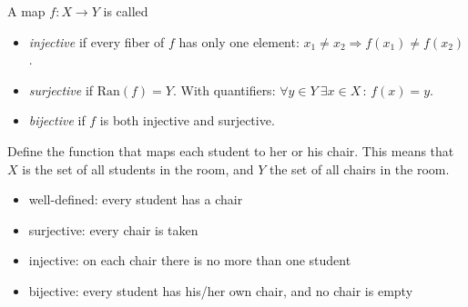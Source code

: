 


\begin{Definition}
A map $f: X \to Y$ is called
\begin{itemize}
 \item \emph{injective} if every fiber of $f$ has only one element: $x_1 \neq x_2 \Rightarrow f(x_1) \neq f(x_2)$.
 \item \emph{surjective} if $\mathrm{Ran}(f)=Y$. With quantifiers: $\forall y\in Y~ \exists x\in X \,:\, f(x)=y$.
 \item \emph{bijective} if $f$ is both injective and surjective.
\end{itemize}
\end{Definition}


\begin{example}
Define the function that maps each student to
her or his chair. This means that $X$ is the set of all students in the room,
and $Y$ the set of all chairs in the room.
\begin{itemize}
 \item well-defined: every student has a chair
 \item surjective: every chair is taken
 \item injective: on each chair there is no more than one student
 \item bijective: every student has his/her own chair, and no chair is empty
\end{itemize}
\end{example}


